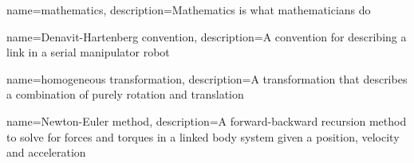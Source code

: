 \makeglossaries
 
 
{
    name=mathematics,
    description={Mathematics is what mathematicians do}
}

{
    name={Denavit-Hartenberg convention},
    description={A convention for describing a link in a serial manipulator robot}
}

{
    name={homogeneous transformation},
    description={A transformation that describes a combination of purely rotation and translation}
}


{
    name={Newton-Euler method},
    description={A forward-backward recursion method to solve for forces and torques in a linked body system given a position, velocity and acceleration}
}